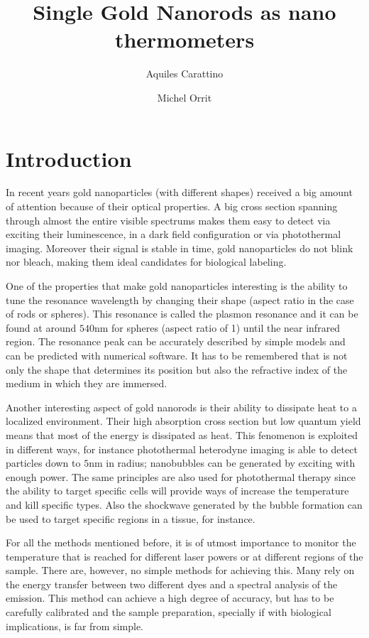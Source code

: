 \documentclass[twocolumn]{article}
\title{Single Gold Nanorods as nano thermometers}
\author{Aquiles Carattino \and Michel Orrit}
\begin{document}
\maketitle
{}

\section{Introduction}
In recent years gold nanoparticles (with different shapes) received a big
amount of attention because of their optical properties. A big cross section
spanning through almost the entire visible spectrums makes them easy to detect
via exciting their luminescence, in a dark field configuration or via
photothermal imaging. Moreover their signal is stable in time, gold
nanoparticles do not blink nor bleach, making them ideal candidates for
biological labeling. 

One of the properties that make gold nanoparticles interesting is the ability to
tune the resonance wavelength by changing their shape (aspect ratio in the case
of rods or spheres). This resonance is called the plasmon resonance and it can
be found at around $540$nm for spheres (aspect ratio of 1) until the near
infrared region. The resonance peak can be accurately described by simple models
and can be predicted with numerical software. It has to be remembered that is
not only the shape that determines its position but also the refractive index of
the medium in which they are immersed. 

Another interesting aspect of gold nanorods is their ability to dissipate heat
to a localized environment. Their high absorption cross section but low quantum
yield means that most of the energy is dissipated as heat. This fenomenon is
exploited in different ways, for instance photothermal heterodyne imaging is
able to detect particles down to $5$nm in radius; nanobubbles can be generated
by exciting with enough power. The same principles are also used for
photothermal therapy since the ability to target specific cells will provide
ways of increase the temperature and kill specific types. Also the shockwave
generated by the bubble formation can be used to target specific regions in a
tissue, for instance. 

For all the methods mentioned before, it is of utmost importance to monitor the
temperature that is reached for different laser powers or at different regions
of the sample. There are, however, no simple methods for achieving this. Many
rely on the energy transfer between two different dyes and a spectral analysis
of the emission. This method can achieve a high degree of accuracy, but has to
be carefully calibrated and the sample preparation, specially if with biological
implications, is far from simple. 
\end{document}
